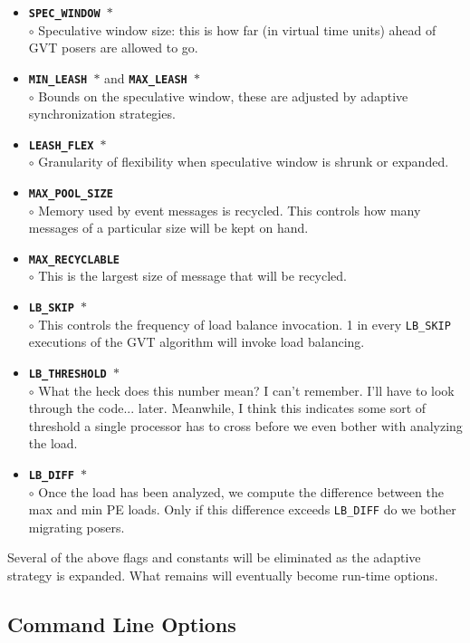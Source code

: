 \begin{itemize}
\item {\tt {\bf SPEC\_WINDOW $*$}}\\
	$\circ$ Speculative window size: this is how far (in virtual time units) ahead of GVT posers are allowed to go.\\
\item {\tt {\bf MIN\_LEASH $*$}} and {\tt {\bf MAX\_LEASH $*$}}\\
	$\circ$ Bounds on the speculative window, these are adjusted by adaptive synchronization strategies.\\
\item {\tt {\bf LEASH\_FLEX $*$}}\\
	$\circ$ Granularity of flexibility when speculative window is shrunk or expanded.\\
\item {\tt {\bf MAX\_POOL\_SIZE}}\\
	$\circ$ Memory used by event messages is recycled.  This controls how many messages of a particular size will be kept on hand.
\item {\tt {\bf MAX\_RECYCLABLE}}\\
	$\circ$ This is the largest size of message that will be recycled.
\item {\tt {\bf LB\_SKIP $*$}}\\
	$\circ$ This controls the frequency of load balance invocation.  1 in every {\tt LB\_SKIP} executions of the GVT algorithm will invoke load balancing.
\item {\tt {\bf LB\_THRESHOLD $*$}}\\
	$\circ$ What the heck does this number mean?  I can't remember.  I'll have to look through the code... later.  Meanwhile, I think this indicates some sort of threshold a single processor has to cross before we even bother with analyzing the load.\\
\item {\tt {\bf LB\_DIFF $*$}}\\
	$\circ$ Once the load has been analyzed, we compute the difference between the max and min PE loads.  Only if this difference exceeds {\tt LB\_DIFF} do we bother migrating posers.\\
\end{itemize}

Several of the above flags and constants will be eliminated as the adaptive strategy is expanded.  What remains will eventually become run-time options.

\subsection{\pose{} Command Line Options}
\label{sec:posecommand}

